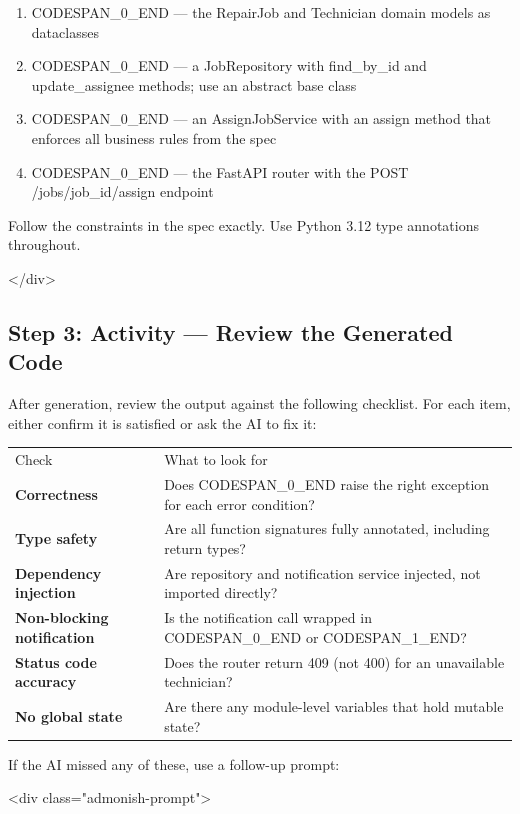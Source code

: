 \documentclass[11pt,a4paper]{book}
\begin{document}
\begin{enumerate}
  \item CODESPAN\_0\_END --- the RepairJob and Technician domain models as dataclasses
  \item CODESPAN\_0\_END --- a JobRepository with find\_by\_id and update\_assignee methods; use an abstract base class
  \item CODESPAN\_0\_END --- an AssignJobService with an assign method that enforces all business rules from the spec
  \item CODESPAN\_0\_END --- the FastAPI router with the POST /jobs/{job\_id}/assign endpoint
\end{enumerate}

Follow the constraints in the spec exactly. Use Python 3.12 type annotations throughout.

</div>

\subsection{Step 3: Activity --- Review the Generated Code}

After generation, review the output against the following checklist. For each item, either confirm it is satisfied or ask the AI to fix it:

\begin{tabular}{ll}
\hline
Check & What to look for \\
\textbf{Correctness} & Does CODESPAN\_0\_END raise the right exception for each error condition? \\
\textbf{Type safety} & Are all function signatures fully annotated, including return types? \\
\textbf{Dependency injection} & Are repository and notification service injected, not imported directly? \\
\textbf{Non-blocking notification} & Is the notification call wrapped in CODESPAN\_0\_END or CODESPAN\_1\_END? \\
\textbf{Status code accuracy} & Does the router return 409 (not 400) for an unavailable technician? \\
\textbf{No global state} & Are there any module-level variables that hold mutable state? \\
\hline
\end{tabular}

If the AI missed any of these, use a follow-up prompt:

<div class="admonish-prompt">
\end{document}
